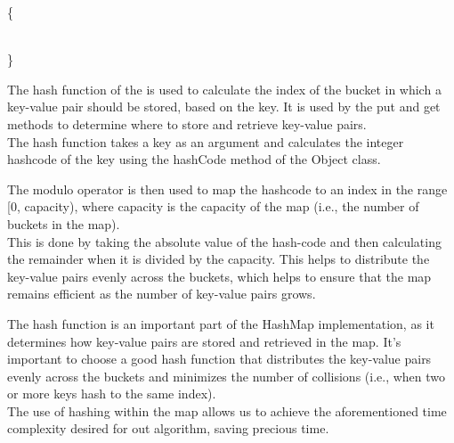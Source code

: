 \documentclass[a4paper]{article}
\begin{document}
\vspace{8mm}
\makeatletter
\renewcommand{\ALG@name}{Hashmap Method}
\makeatother

\begin{algorithm}
\caption{}\label{euclid}
\begin{algorithmic}[1]

\algrenewcommand{}
 {\{ }

\State{\tt \} } \\
{\}}


\EndProcedure
\end{algorithmic}
\end{algorithm}
\vspace{6mm}

The hash function of the is used to calculate the index of the bucket 
in which a key-value pair should be stored, based on the key.
It is used by the put and get methods to determine where to store and retrieve key-value pairs. \\

The hash function takes a key as an argument and calculates the integer hashcode of the key using the hashCode method of the Object class.

The modulo operator is then used to map the hashcode to an index in the range [0, capacity), 
where capacity is the capacity of the map (i.e., the number of buckets in the map). \\

This is done by taking the absolute value of the hash-code and then calculating the remainder when it is divided by the capacity. 
This helps to distribute the key-value pairs evenly across the buckets,
which helps to ensure that the map remains efficient as the number of key-value pairs grows.

The hash function is an important part of the HashMap implementation,
as it determines how key-value pairs are stored and retrieved in the map. 
It's important to choose a good hash function that distributes the key-value pairs evenly across the buckets
and minimizes the number of collisions (i.e., when two or more keys hash to the same index). \\

The use of hashing within the map allows us to achieve the aforementioned time complexity desired for out algorithm, 
saving precious time. \\
\end{document}
